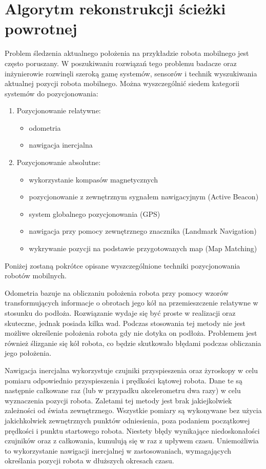 \section{Algorytm rekonstrukcji ścieżki powrotnej}
\label{sec:rtrwca}
Problem śledzenia aktualnego położenia na przykładzie robota mobilnego jest często poruszany. W poszukiwaniu rozwiązań tego problemu badacze oraz inżynierowie rozwinęli szeroką gamę systemów, sensorów i technik wyszukiwania aktualnej pozycji robota mobilnego. Można wyszczególnić siedem kategorii systemów do pozycjonowania:
\begin{enumerate}
  \item Pozycjonowanie relatywne:
  \begin{itemize}
    \item odometria
    \item nawigacja inercjalna
  \end{itemize}
  \item Pozycjonowanie absolutne:
  \begin{itemize}
    \item wykorzystanie kompasów magnetycznych
    \item pozycjonowanie z zewnętrznym sygnałem nawigacyjnym (Active Beacon)
    \item system globalnego pozycjonowania (GPS)
    \item nawigacja przy pomocy zewnętrznego znacznika (Landmark Navigation)
    \item wykrywanie pozycji na podstawie przygotowanych map (Map Matching)
  \end{itemize}
\end{enumerate}
Poniżej zostaną pokrótce opisane wyszczególnione techniki pozycjonowania robotów mobilnych.

Odometria bazuje na obliczaniu położenia robota przy pomocy wzorów transformujących informacje o obrotach jego kół na przemieszczenie relatywne w stosunku do podłoża. Rozwiązanie wydaje się być proste w realizacji oraz skuteczne, jednak posiada kilka wad. Podczas stosowania tej metody nie jest możliwe określenie położenia robota gdy nie dotyka on podłoża. Problemem jest również ślizganie się kół robota, co będzie skutkowało błędami podczas obliczania jego położenia.

Nawigacja inercjalna wykorzystuje czujniki przyspieszenia oraz żyroskopy w celu pomiaru odpowiednio przyspieszenia i prędkości kątowej robota. Dane te są następnie całkowane raz (lub w przypadku akcelerometru dwa razy) w celu wyznaczenia pozycji robota. Zaletami tej metody jest brak jakiejkolwiek zależności od świata zewnętrznego. Wszystkie pomiary są wykonywane bez użycia jakichkolwiek zewnętrznych punktów odniesienia, poza podaniem początkowej prędkości i punktu startowego robota. Niestety błędy wynikające niedoskonałości czujników oraz z całkowania, kumulują się w raz z upływem czasu. Uniemożliwia to wykorzystanie nawigacji inercjalnej w zastosowaniach, wymagających określania pozycji robota w dłuższych okresach czasu.

